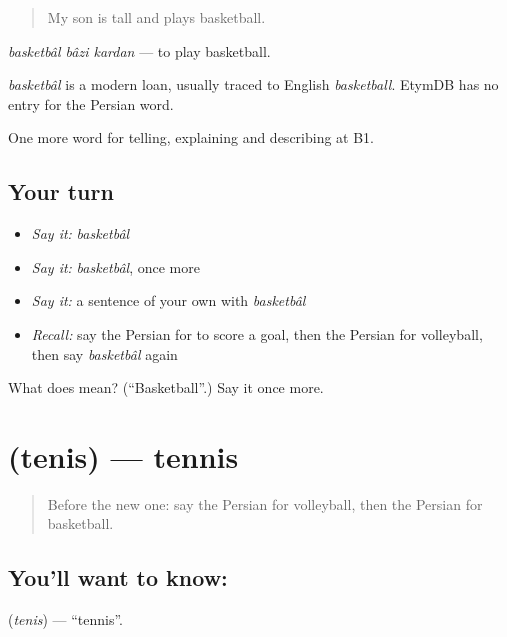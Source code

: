 \begin{quote}
My son is tall and plays basketball.
\end{quote}

\emph{basketbâl bâzi kardan} — to play basketball.

\begin{cousinweb}
\emph{basketbâl} is a modern loan, usually traced to English \emph{basketball}. EtymDB has no entry for the Persian word.
\end{cousinweb}

\begin{grammarlens}[title={What you've built}]
One more word for telling, explaining and describing at B1.
\end{grammarlens}

\subsection*{Your turn}
\begin{itemize}
\raggedright
  \item \emph{Say it:} \emph{basketbâl}
  \item \emph{Say it:} \emph{basketbâl}, once more
  \item \emph{Say it:} a sentence of your own with \emph{basketbâl}
  \item \emph{Recall:} say the Persian for to score a goal, then the Persian for volleyball, then say \emph{basketbâl} again
\end{itemize}

\begin{tcolorbox}[breakable,colback=teal!4,colframe=teal!35!black,title={Before you move on}]
What does  mean? (\textquotedblleft{}Basketball\textquotedblright{}.) Say it once more.
\end{tcolorbox}
\section[\texorpdfstring{\fa{تنیس} (tenis)}{تنیس (tenis)}]{ (tenis) — tennis}

\label{lesson:FA-C514-tenis}



\begin{quote}
Before the new one: say the Persian for volleyball, then the Persian for basketball.
\end{quote}

\subsection*{You'll want to know: }
\textbf{} (\emph{tenis}) — \textquotedblleft{}tennis\textquotedblright{}.

